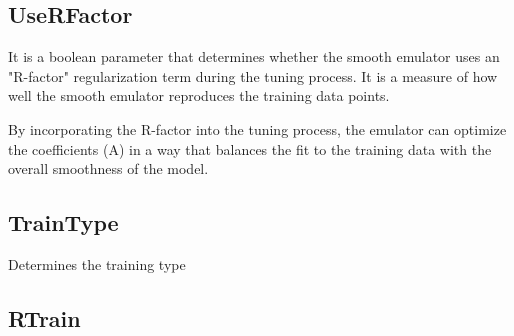 \documentclass[12pt]{article}
\numberwithin{equation}{section}
\numberwithin{figure}{section}
\begin{document}
\subsection{UseRFactor}
It is a boolean parameter that determines whether the smooth emulator uses an "R-factor" regularization term during the tuning process. It is a measure of how well the smooth emulator reproduces the training data points.

By incorporating the R-factor into the tuning process, the emulator can optimize the coefficients (A) in a way that balances the fit to the training data with the overall smoothness of the model.

\subsection{TrainType}
  Determines the training type 

\subsection{RTrain}
\end{document}
